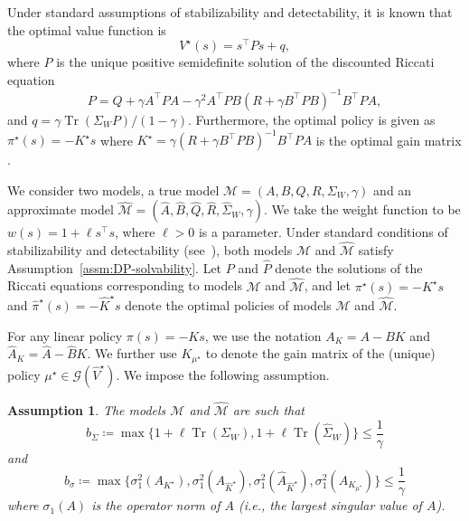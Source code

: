 \documentclass[letterpaper, 10pt]{IEEEtran}
\newtheorem{assumption}{Assumption}
\newcommand*\ALPHABET{\mathcal}
\DeclareMathOperator{\Tr}{Tr}
\begin{document}
Under standard assumptions of stabilizability and detectability, it is known that the optimal value function is
\[
    V^\star(s) = s^\intercal P s + q,
\]
where $P$ is the unique positive semidefinite solution of the discounted Riccati equation 
\begin{equation}
    P =  Q + \gamma A^\intercal P A - \gamma^2 A^\intercal PB(R + \gamma B^\intercal P B)^{-1} B^\intercal P A,
\end{equation}
and  
\(
    q = \gamma \Tr(\Sigma_W P)/(1-\gamma). 
\) Furthermore, the optimal policy is given as $\pi^\star(s) = -K^\star s$ where $K^\star = \gamma ( R + \gamma  B^\intercal  P B)^{-1}B^\intercal  P A$ is the optimal gain matrix \cite{bertsekas2015dynamic}.

We consider two models, a true model $\ALPHABET M = (A, B, Q, R, \Sigma_W, \gamma)$ and an approximate model $\hat{\ALPHABET M}= (\hat A, \hat B, \hat Q, \hat R, \hat \Sigma_W, \gamma)$. We take the weight function to be $w(s) = 1 + \ell s^\intercal s$, where $\ell > 0$ is a parameter. Under standard conditions of stabilizability and detectability (see~\cite{bertsekas2015dynamic}), both models $\ALPHABET M$ and $\hat {\ALPHABET M}$ satisfy Assumption~\ref{assm:DP-solvability}. Let $P$ and $\hat P$ denote the solutions of the Riccati equations corresponding to models $\ALPHABET M$ and $\hat {\ALPHABET M}$, and let $\pi^\star(s) = -K^\star s$ and $\hat \pi^\star(s) = -\hat K^\star s$ denote the optimal policies of models ${\ALPHABET M}$ and  $\hat {\ALPHABET M}$.

 For any linear policy $\pi(s) = -Ks$, we use the notation $A_K = A - BK$ and $\hat A_K = \hat A - \hat B K$. We further use $K_{\mu^\star}$ to denote the gain matrix of the (unique)  policy  ${\mu^\star} \in \ALPHABET{G}(\hat V^\star)$. We impose the following assumption.
\begin{assumption}\label{ass:LQ}
    The models $\ALPHABET M$ and $\hat {\ALPHABET M}$ are such that
    \[
        b_\Sigma \coloneqq \max\bigl\{
        1 + \ell \Tr(\Sigma_W),
        1 + \ell \Tr(\hat \Sigma_W)
        \bigr\} \le \frac 1\gamma
    \]
    and
    \[
       b_\sigma \coloneqq \max\bigl\{
            \sigma_1^2(A_{K^\star}),
            \sigma_1^2(A_{\hat K^\star}),
            \sigma_1^2(\hat A_{\hat K^\star}),
            \sigma_1^2(A_{K_{\mu^\star}})
       \bigr\} \le \frac 1\gamma 
    \]
    where $\sigma_1(A)$ is the operator norm of $A$ (i.e., the largest singular value of $A$). 
\end{assumption}
\end{document}
